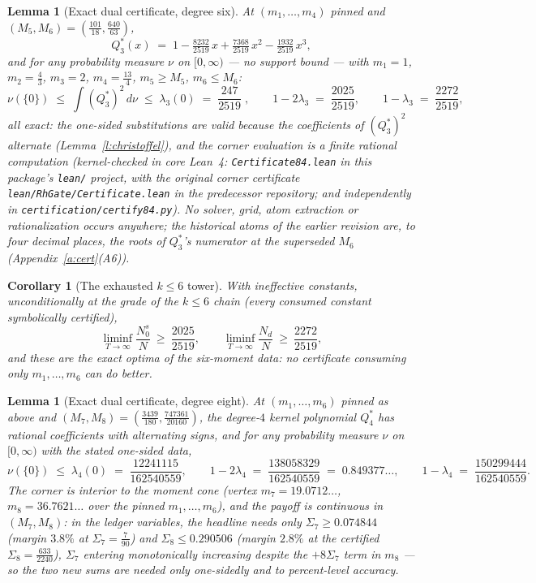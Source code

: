 \documentclass[11pt]{article}
\numberwithin{equation}{section}
\newtheorem{lemma}[theorem]{Lemma}
\newtheorem{corollary}[theorem]{Corollary}
\theoremstyle{definition}
\theoremstyle{remark}
\begin{document}
\begin{lemma}[Exact dual certificate, degree six]\label{l:dual}
At $(m_1,\dots,m_4)$ pinned and $(M_5,M_6)=(\tfrac{101}{18},
\tfrac{640}{63})$,
\[
Q_3^*(x)\;=\;1-\tfrac{8232}{2519}\,x+\tfrac{7368}{2519}\,x^2
-\tfrac{1932}{2519}\,x^3 ,
\]
and for any probability measure $\nu$ on $[0,\infty)$ --- no
support bound --- with $m_1=1$, $m_2=\tfrac43$, $m_3=2$,
$m_4=\tfrac{13}4$, $m_5\ge M_5$, $m_6\le M_6$:
\[
\nu(\{0\})\;\le\;\int (Q_3^*)^2\,d\nu
\;\le\;\lambda_3(0)\;=\;\frac{247}{2519}\;,
\qquad
1-2\lambda_3\;=\;\frac{2025}{2519},\qquad
1-\lambda_3\;=\;\frac{2272}{2519},
\]
all exact: the one-sided substitutions are valid because the
coefficients of $(Q_3^*)^2$ alternate
(Lemma~\ref{l:christoffel}), and the corner evaluation is a
finite rational computation (kernel-checked in core Lean~4:
\texttt{Certificate84.lean} in this package's \texttt{lean/}
project, with the original corner certificate
\texttt{lean/RhGate/}\allowbreak\texttt{Certificate.lean} in
the predecessor repository; and independently in
\texttt{certification/}\allowbreak\texttt{certify84.py}).
No solver, grid, atom
extraction or rationalization occurs anywhere; the historical
atoms of the earlier revision are, to four decimal places, the
roots of $Q_3^*$'s numerator at the superseded $M_6$
(Appendix~\ref{a:cert}(A6)).
\end{lemma}

\begin{corollary}[The exhausted $k\le6$ tower]\label{c:2025}
With ineffective constants, unconditionally at the grade of
the $k\le6$ chain (every consumed constant symbolically
certified),
\[
\liminf_{T\to\infty}\frac{N_0^{s}}{N}\ \ge\ \frac{2025}{2519},
\qquad
\liminf_{T\to\infty}\frac{N_d}{N}\ \ge\ \frac{2272}{2519},
\]
and these are the \emph{exact} optima of the six-moment data:
no certificate consuming only $m_1,\dots,m_6$ can do better.
\end{corollary}

\begin{lemma}[Exact dual certificate, degree
eight]\label{l:dual8}
At $(m_1,\dots,m_6)$ pinned as above and
$(M_7,M_8)=(\tfrac{3439}{180},\tfrac{747361}{20160})$, the degree-$4$
kernel polynomial $Q_4^*$ has rational coefficients with
alternating signs, and for any probability measure $\nu$ on
$[0,\infty)$ with the stated one-sided data,
\[
\nu(\{0\})\;\le\;\lambda_4(0)\;=\;\frac{12241115}{162540559},
\qquad
1-2\lambda_4\;=\;\frac{138058329}{162540559}\;=\;0.849377\ldots,
\qquad
1-\lambda_4\;=\;\frac{150299444}{162540559}.
\]
The corner is interior to the moment cone (vertex
$m_7=19.0712\ldots$, $m_8=36.7621\ldots$ over the pinned
$m_1,\dots,m_6$), and the payoff is continuous in
$(M_7,M_8)$: in the ledger variables, the headline needs only
$\Sigma_7\ge0.074844$ (margin $3.8\%$ at $\Sigma_7=\tfrac7{90}$)
and $\Sigma_8\le0.290506$ (margin $2.8\%$ at the certified
$\Sigma_8=\tfrac{633}{2240}$),
$\Sigma_7$ entering monotonically \emph{increasing} despite the
$+8\Sigma_7$ term in $m_8$ --- so the two new sums are needed
only one-sidedly and to percent-level accuracy.
\end{lemma}
\end{document}
